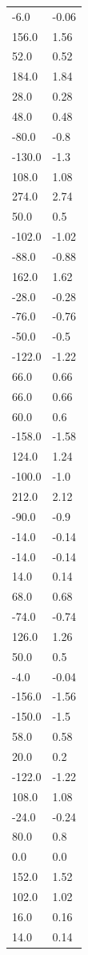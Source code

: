 \begin{longtable}{ll}
-6.0 & -0.06 \\
156.0 & 1.56 \\
52.0 & 0.52 \\
184.0 & 1.84 \\
28.0 & 0.28 \\
48.0 & 0.48 \\
-80.0 & -0.8 \\
-130.0 & -1.3 \\
108.0 & 1.08 \\
274.0 & 2.74 \\
50.0 & 0.5 \\
-102.0 & -1.02 \\
-88.0 & -0.88 \\
162.0 & 1.62 \\
-28.0 & -0.28 \\
-76.0 & -0.76 \\
-50.0 & -0.5 \\
-122.0 & -1.22 \\
66.0 & 0.66 \\
66.0 & 0.66 \\
60.0 & 0.6 \\
-158.0 & -1.58 \\
124.0 & 1.24 \\
-100.0 & -1.0 \\
212.0 & 2.12 \\
-90.0 & -0.9 \\
-14.0 & -0.14 \\
-14.0 & -0.14 \\
14.0 & 0.14 \\
68.0 & 0.68 \\
-74.0 & -0.74 \\
126.0 & 1.26 \\
50.0 & 0.5 \\
-4.0 & -0.04 \\
-156.0 & -1.56 \\
-150.0 & -1.5 \\
58.0 & 0.58 \\
20.0 & 0.2 \\
-122.0 & -1.22 \\
108.0 & 1.08 \\
-24.0 & -0.24 \\
80.0 & 0.8 \\
0.0 & 0.0 \\
152.0 & 1.52 \\
102.0 & 1.02 \\
16.0 & 0.16 \\
14.0 & 0.14 \\

\end{longtable}
